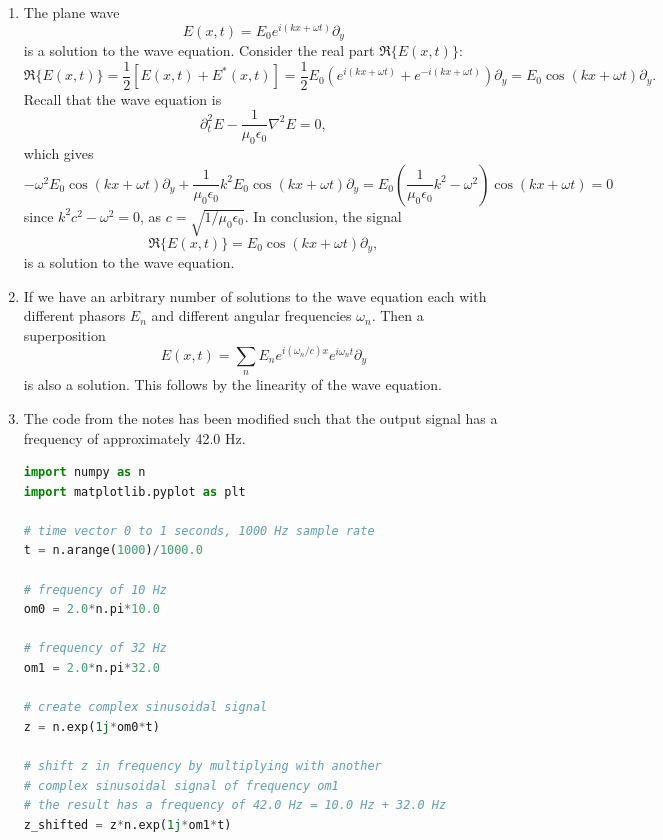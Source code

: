\begin{enumerate}
\item The plane wave
$$E(x,t)=E_{0}e^{i(kx+\omega t)}\partial_{y}$$
is a solution to the wave equation. Consider the real part $\Re\{E(x,t)\}$:
$$\Re\{E(x,t)\}=\frac{1}{2}[E(x,t)+E^{*}(x,t)]=\frac{1}{2}E_{0}(e^{i(kx+\omega t)}+e^{-i(kx+\omega t)})\partial_{y}=E_{0}\cos(kx+\omega t)\partial_{y}.$$
Recall that the wave equation is 
$$\partial_{t}^{2}E-\frac{1}{\mu_{0}\epsilon_{0}}\nabla^{2}E=0,$$
which gives
$$-\omega^{2}E_{0}\cos(kx+\omega t)\partial_{y}+\frac{1}{\mu_{0}\epsilon_{0}}k^{2}E_{0}\cos(kx+\omega t)\partial_{y}=E_{0}\left(\frac{1}{\mu_{0}\epsilon_{0}}k^{2}-\omega^{2}\right)\cos(kx+\omega t)=0$$
since $k^{2}c^{2}-\omega^{2}=0$, as $c=\sqrt{1/\mu_0\epsilon_0}$. In conclusion, the signal
$$\Re\{E(x,t)\}=E_{0}\cos(kx+\omega t)\partial_{y},$$
is a solution to the wave equation. 

\item If we have an arbitrary number of solutions to the wave equation each with different phasors $E_{n}$ and different angular frequencies $\omega_{n}$. Then a superposition 
$$E(x,t)=\sum_{n}E_{n}e^{i(\omega_{n}/c)x}e^{i\omega_{n}t}\partial_{y}$$
is also a solution. This follows by the linearity of the wave equation. 

\item The code from the notes has been modified such that the output signal has a frequency of approximately 42.0 Hz. 
\begin{lstlisting}[language=Python, caption=Adding frequencies,label=code:ex6.6]
import numpy as n
import matplotlib.pyplot as plt

# time vector 0 to 1 seconds, 1000 Hz sample rate
t = n.arange(1000)/1000.0

# frequency of 10 Hz
om0 = 2.0*n.pi*10.0

# frequency of 32 Hz
om1 = 2.0*n.pi*32.0

# create complex sinusoidal signal
z = n.exp(1j*om0*t)

# shift z in frequency by multiplying with another 
# complex sinusoidal signal of frequency om1
# the result has a frequency of 42.0 Hz = 10.0 Hz + 32.0 Hz
z_shifted = z*n.exp(1j*om1*t)


\end{lstlisting}
\end{enumerate}
